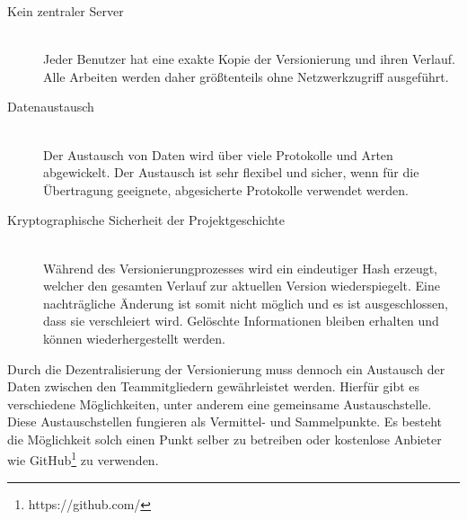 \begin{description}

\item[Kein zentraler Server] \hfill \\
Jeder Benutzer hat eine exakte Kopie der Versionierung und ihren Verlauf. Alle Arbeiten werden daher größtenteils ohne Netzwerkzugriff ausgeführt.

\item[Datenaustausch] \hfill \\
Der Austausch von Daten wird über viele Protokolle und Arten abgewickelt. Der Austausch ist sehr flexibel und sicher, wenn für die Übertragung geeignete, abgesicherte Protokolle verwendet werden.

\item[Kryptographische Sicherheit der Projektgeschichte] \hfill \\
Während des Versionierungprozesses wird ein eindeutiger Hash erzeugt, welcher den gesamten Verlauf zur aktuellen Version wiederspiegelt. Eine nachträgliche Änderung ist somit nicht möglich und es ist ausgeschlossen, dass sie verschleiert wird. Gelöschte Informationen bleiben erhalten und können wiederhergestellt werden.
\end{description}

Durch die Dezentralisierung der Versionierung muss dennoch ein Austausch der Daten zwischen den Teammitgliedern gewährleistet werden. Hierfür gibt es verschiedene Möglichkeiten, unter anderem eine gemeinsame Austauschstelle. Diese Austauschstellen fungieren als Vermittel- und Sammelpunkte. Es besteht die Möglichkeit solch einen Punkt selber zu betreiben oder kostenlose Anbieter wie GitHub\footnote{https://github.com/} zu verwenden.